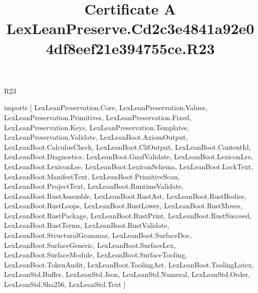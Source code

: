 \begin{lexlean}{R23}
\title{Certificate A LexLeanPreserve.Cd2c3e4841a92e04df8eef21e394755ce.R23}
\begin{coremodule}
imports [
  LexLeanPreservation.Core,
  LexLeanPreservation.Values,
  LexLeanPreservation.Primitives,
  LexLeanPreservation.Fixed,
  LexLeanPreservation.Keys,
  LexLeanPreservation.Templates,
  LexLeanPreservation.Validate,
  LexLeanBoot.AxiomOutput,
  LexLeanBoot.CalculusCheck,
  LexLeanBoot.CliOutput,
  LexLeanBoot.ContentId,
  LexLeanBoot.Diagnostics,
  LexLeanBoot.GnafValidate,
  LexLeanBoot.LexiconLre,
  LexLeanBoot.LexiconLse,
  LexLeanBoot.LexiconSchema,
  LexLeanBoot.LockText,
  LexLeanBoot.ManifestText,
  LexLeanBoot.PrimitiveScan,
  LexLeanBoot.ProjectText,
  LexLeanBoot.RuntimeValidate,
  LexLeanBoot.RustAssemble,
  LexLeanBoot.RustAst,
  LexLeanBoot.RustBodies,
  LexLeanBoot.RustLoops,
  LexLeanBoot.RustLower,
  LexLeanBoot.RustMoves,
  LexLeanBoot.RustPackage,
  LexLeanBoot.RustPrint,
  LexLeanBoot.RustSucceed,
  LexLeanBoot.RustTerms,
  LexLeanBoot.RustValidate,
  LexLeanBoot.StructuralGrammar,
  LexLeanBoot.SurfaceDoc,
  LexLeanBoot.SurfaceGeneric,
  LexLeanBoot.SurfaceLex,
  LexLeanBoot.SurfaceModule,
  LexLeanBoot.SurfaceTooling,
  LexLeanBoot.TokenAudit,
  LexLeanBoot.ToolingAst,
  LexLeanBoot.ToolingLatex,
  LexLeanStd.Buffer,
  LexLeanStd.Json,
  LexLeanStd.Numeral,
  LexLeanStd.Order,
  LexLeanStd.Sha256,
  LexLeanStd.Text
]


\end{coremodule}
\end{lexlean}

